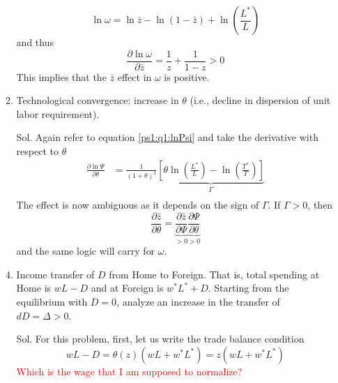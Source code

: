 \documentclass{article}
\begin{document}
\begin{enumerate}
\begin{enumerate}
\begin{equation*}
            \ln\omega = \ln\bar{z}-\ln(1-\bar{z}) + \ln\left(\frac{L^*}{L}\right)
        \end{equation*}
        and thus 
        \begin{equation*}
            \frac{\partial\ln\omega}{\partial\bar{z}} = \frac{1}{z}+\frac{1}{1-z}>0
        \end{equation*}
        This implies that the $\bar{z}$ effect in $\omega$ is positive. 
        \item Technological convergence: increase in $\theta$ (i.e., decline in dispersion of unit labor requirement).
        \item[Sol.] Again refer to equation \eqref{ps1:q1:lnPsi} and take the derivative with respect to $\theta$
        \begin{align*}
            \frac{\partial\ln\Psi}{\partial\theta} &= \frac{1}{(1+\theta)^2}\underbrace{\left[\theta\ln\left(\frac{L^*}{L}\right)-\ln\left(\frac{T^*}{T}\right)\right]}_{\Gamma}  \\ 
        \end{align*}
        The effect is now ambiguous as it depends on the sign of $\Gamma$. If $\Gamma>0$, then 
        \begin{equation*}
            \frac{\partial\bar{z}}{\partial\theta} = \underbrace{\frac{\partial\bar{z}}{\partial\Psi}}_{>0}\underbrace{\frac{\partial\Psi}{\partial\theta}}_{>0}
        \end{equation*}
        and the same logic will carry for $\omega$. 
        \item Income transfer of $D$ from Home to Foreign. That is, total spending at Home is $w L-D$ and at Foreign is $w^* L^*+D$. Starting from the equilibrium with $D=0$, analyze an increase in the transfer of $d D=\Delta>0$.
        \item[Sol.] For this problem, first, let us write the trade balance condition
        \begin{equation*}
            wL-D = \theta(z)\left(wL+w^*L^*\right) = z\left(wL+w^*L^*\right)
        \end{equation*}
        \textcolor{red}{Which is the wage that I am supposed to normalize?}
    \end{enumerate}
\end{enumerate}
\end{document}
